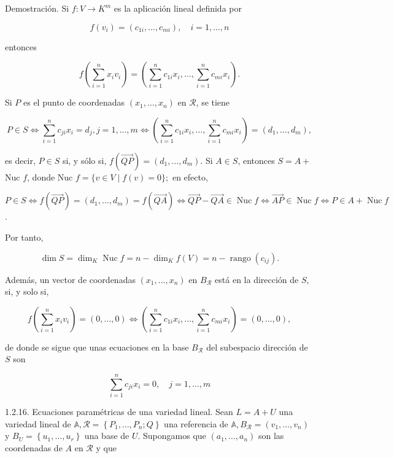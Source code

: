 \documentclass[12pt, a4paper, ones, notitlepage, openany,titlepage]{article}
\begin{document}
Demostración. Si $f: V \rightarrow K^{m}$ es la aplicación lineal definida por

$$
f\left(v_{i}\right)=\left(c_{1 i}, \ldots, c_{m i}\right), \quad i=1, \ldots, n
$$

entonces

$$
f\left(\sum_{i=1}^{n} x_{i} v_{i}\right)=\left(\sum_{i=1}^{n} c_{1 i} x_{i}, \ldots, \sum_{i=1}^{n} c_{m i} x_{i}\right) .
$$

Si $P$ es el punto de coordenadas $\left(x_{1}, \ldots, x_{n}\right)$ en $\mathcal{R}$, se tiene

$$
P \in S \Longleftrightarrow \sum_{i=1}^{n} c_{j i} x_{i}=d_{j}, j=1, \ldots, m \Longleftrightarrow\left(\sum_{i=1}^{n} c_{1 i} x_{i}, \ldots, \sum_{i=1}^{n} c_{m i} x_{i}\right)=\left(d_{1}, \ldots, d_{m}\right),
$$

es decir, $P \in S$ si, y sólo si, $f(\overrightarrow{Q P})=\left(d_{1}, \ldots, d_{m}\right)$. Si $A \in S$, entonces $S=A+$ Nuc $f$, donde Nuc $f=\{v \in V \mid f(v)=0\} ;$ en efecto,

$P \in S \Longleftrightarrow f(\overrightarrow{Q P})=\left(d_{1}, \ldots, d_{m}\right)=f(\overrightarrow{Q A}) \Longleftrightarrow \overrightarrow{Q P}-\overrightarrow{Q A} \in \operatorname{Nuc} f \Longleftrightarrow \overrightarrow{A P} \in \operatorname{Nuc} f \Longleftrightarrow P \in A+\operatorname{Nuc} f$.

Por tanto,

$$
\dim  S=\dim _{K} \operatorname{Nuc} f=n-\dim _{K} f(V)=n-\operatorname{rango}\left(c_{i j}\right) .
$$

Además, un vector de coordenadas $\left(x_{1}, \ldots, x_{n}\right)$ en $B_{\mathcal{R}}$ está en la dirección de $S$, si, y solo si,

$$
f\left(\sum_{i=1}^{n} x_{i} v_{i}\right)=(0, \ldots, 0) \Longleftrightarrow\left(\sum_{i=1}^{n} c_{1 i} x_{i}, \ldots, \sum_{i=1}^{n} c_{m i} x_{i}\right)=(0, \ldots, 0),
$$

de donde se sigue que unas ecuaciones en la base $B_{\mathcal{R}}$ del subespacio dirección de $S$ son

$$
\sum_{i=1}^{n} c_{j i} x_{i}=0, \quad j=1, \ldots, m
$$

1.2.16. Ecuaciones paramétricas de una variedad lineal. Sean $L=A+U$ una variedad lineal de $\mathbb{A}, \mathcal{R}=\left\{P_{1}, \ldots, P_{n} ; Q\right\}$ una referencia de $\mathbb{A}, B_{\mathcal{R}}=\left(v_{1}, \ldots, v_{n}\right)$ y $B_{U}=\left\{u_{1}, \ldots, u_{r}\right\}$ una base de $U$. Supongamos que $\left(a_{1}, \ldots, a_{n}\right)$ son las coordenadas de $A$ en $\mathcal{R}$ y que
\end{document}
